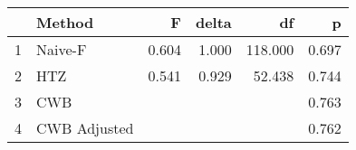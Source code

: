 \begin{table}[ht]
\centering
\begin{tabular}{rlrrrr}
  \hline
 & Method & F & delta & df & p \\ 
  \hline
1 & Naive-F & 0.604 & 1.000 & 118.000 & 0.697 \\ 
  2 & HTZ & 0.541 & 0.929 & 52.438 & 0.744 \\ 
  3 & CWB &  &  &  & 0.763 \\ 
  4 & CWB Adjusted &  &  &  & 0.762 \\ 
   \hline
\end{tabular}
\end{table}
